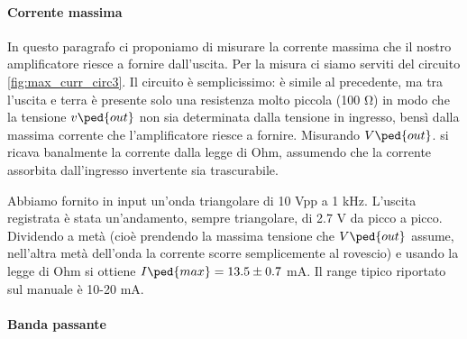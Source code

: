 \paragraph{Corrente massima}

In questo paragrafo ci proponiamo di misurare la corrente massima che il nostro amplificatore
riesce a fornire dall'uscita. Per la misura ci siamo serviti del circuito \ref{fig:max_curr_circ3}.
Il circuito è semplicissimo: è simile al precedente, ma tra l'uscita e terra è presente solo una resistenza
molto piccola (100 \si{\ohm}) in modo che la tensione $v\ped{out}$ non sia determinata dalla tensione
in ingresso, bensì dalla massima corrente che l'amplificatore riesce a fornire. Misurando $V\ped{out}$.
si ricava banalmente la corrente dalla legge di Ohm, assumendo che la corrente assorbita dall'ingresso
invertente sia trascurabile.

Abbiamo fornito in input un'onda triangolare di 10 Vpp a 1 kHz. L'uscita registrata è stata un'andamento,
sempre triangolare, di 2.7 V da picco a picco. Dividendo a metà (cioè prendendo la massima tensione che $V\ped{out}$
assume, nell'altra metà dell'onda la corrente scorre semplicemente al rovescio) e usando la legge di Ohm
si ottiene $I\ped{max} = 13.5 \pm 0.7$ mA. Il range tipico riportato sul manuale è 10-20 mA.

\paragraph{Banda passante}